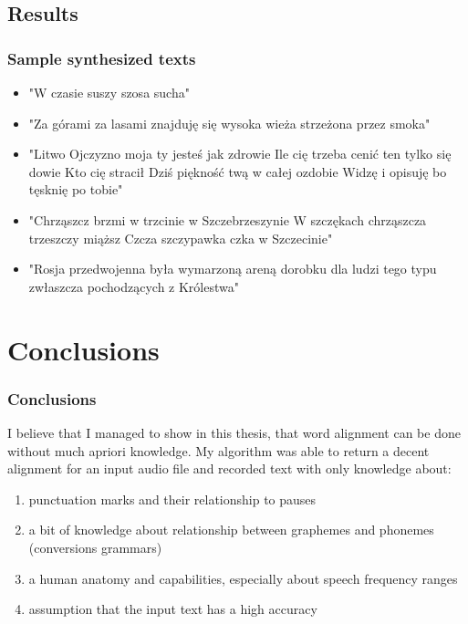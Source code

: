 \documentclass[]{beamer}
\begin{document}
\subsection{Results}
\begin{frame}
    \frametitle{Sample synthesized texts}
    \begin{itemize}
        \item<2-> "W czasie suszy szosa sucha"
        \item<3-> "Za górami za lasami znajduję się wysoka wieża strzeżona przez smoka"
        \item<4-> "Litwo Ojczyzno moja ty jesteś jak zdrowie Ile cię trzeba cenić ten tylko się dowie Kto cię stracił Dziś piękność twą w całej ozdobie Widzę i opisuję bo tęsknię po tobie"
        \item<5-> "Chrząszcz brzmi w trzcinie w Szczebrzeszynie W szczękach chrząszcza trzeszczy miąższ Czcza szczypawka czka w Szczecinie"
        \item<6-> "Rosja przedwojenna była wymarzoną areną dorobku dla ludzi tego typu zwłaszcza pochodzących z Królestwa"
    \end{itemize}
\end{frame}

\section{Conclusions}

\begin{frame}
    \frametitle{Conclusions}
    I believe that I managed to show in this thesis, that word alignment can be done without much apriori knowledge.
    My algorithm was able to return a decent alignment for an input audio file and recorded text with only knowledge about:
    \begin{enumerate}
        \item punctuation marks and their relationship to pauses
        \item a bit of knowledge about relationship between graphemes and phonemes (conversions grammars)
        \item a human anatomy and capabilities, especially about speech frequency ranges
        \item assumption that the input text has a high accuracy
    \end{enumerate}
\end{frame}
\end{document}
